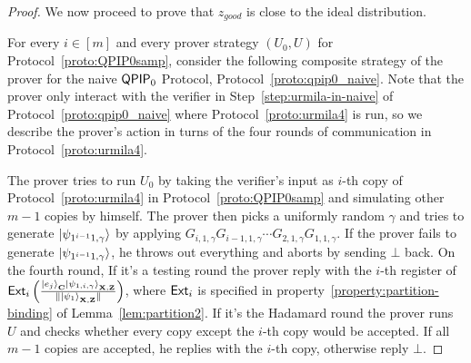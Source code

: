 \begin{proof}
We now proceed to prove that $z_{good}$ is close to the ideal distribution.

For every $i\in [m]$ and every prover strategy $(U_0,U)$ for Protocol~\ref{proto:QPIP0samp}, consider the following composite strategy of the prover for the naive $\operatorname{\mathsf{QPIP}}_0$ Protocol, Protocol~\ref{proto:qpip0_naive}. Note that the prover only interact with the verifier in Step~\ref{step:urmila-in-naive} of Protocol~\ref{proto:qpip0_naive} where Protocol~\ref{proto:urmila4} is run, so we describe the prover's action in turns of the four rounds of communication in Protocol~\ref{proto:urmila4}.

The prover tries to run $U_0$ by taking the verifier's input as $i$-th copy of Protocol~\ref{proto:urmila4} in Protocol~\ref{proto:QPIP0samp} and simulating other $m-1$ copies by himself. The prover then picks a uniformly random $\gamma$ and  tries to generate $\ket{\psi_{1^{i-1}1,\gamma}}$ by applying $G_{i,1,\gamma}G_{i-1,1,\gamma} \cdots G_{2,1,\gamma}G_{1,1,\gamma}$. If the prover fails to generate $\ket{\psi_{1^{i-1}1,\gamma}}$, he throws out everything and aborts by sending $\bot$ back.   On the fourth round,  If it's a testing round the prover reply with the $i$-th register of $\mathsf{Ext}_i\left(\frac{\ket{e_j}_{\mathbf{C}}\ket{\psi_{1,i,\gamma}}_{\mathbf{X},\mathbf{Z}}}{\|\ket{\psi_1}_{\mathbf{X},\mathbf{Z}}\|}\right)$, where $\mathsf{Ext}_i$ is specified in property~\ref{property:partition-binding} of Lemma~\ref{lem:partition2}. If it's the Hadamard round  the prover  runs $U$ and checks whether every copy except the $i$-th copy would be accepted. If all $m-1$ copies are accepted, he replies with the $i$-th copy, otherwise reply $\bot$.


\end{proof}
